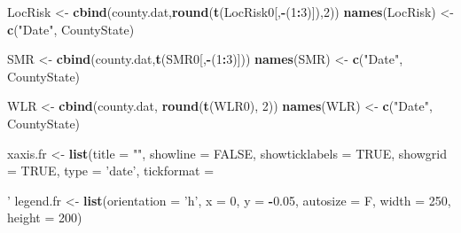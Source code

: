\documentclass[]{book}
\newenvironment{Shaded}{\begin{snugshade}}{\end{snugshade}}
\newcommand{\KeywordTok}[1]{\textcolor[rgb]{0.13,0.29,0.53}{\textbf{#1}}}
\newcommand{\DataTypeTok}[1]{\textcolor[rgb]{0.13,0.29,0.53}{#1}}
\newcommand{\DecValTok}[1]{\textcolor[rgb]{0.00,0.00,0.81}{#1}}
\newcommand{\FloatTok}[1]{\textcolor[rgb]{0.00,0.00,0.81}{#1}}
\newcommand{\StringTok}[1]{\textcolor[rgb]{0.31,0.60,0.02}{#1}}
\newcommand{\OtherTok}[1]{\textcolor[rgb]{0.56,0.35,0.01}{#1}}
\newcommand{\OperatorTok}[1]{\textcolor[rgb]{0.81,0.36,0.00}{\textbf{#1}}}
\newcommand{\NormalTok}[1]{#1}
\begin{document}
\begin{Shaded}
\begin{Highlighting}[]
{{{{{{{{\NormalTok{  LocRisk <-}\StringTok{ }\KeywordTok{cbind}\NormalTok{(county.dat,}\KeywordTok{round}\NormalTok{(}\KeywordTok{t}\NormalTok{(LocRisk0[,}\OperatorTok{-}\NormalTok{(}\DecValTok{1}\OperatorTok{:}\DecValTok{3}\NormalTok{)]),}\DecValTok{2}\NormalTok{))}
  \KeywordTok{names}\NormalTok{(LocRisk) <-}\StringTok{ }\KeywordTok{c}\NormalTok{(}\StringTok{"Date"}\NormalTok{, CountyState)}

\NormalTok{  SMR <-}\StringTok{ }\KeywordTok{cbind}\NormalTok{(county.dat,}\KeywordTok{t}\NormalTok{(SMR0[,}\OperatorTok{-}\NormalTok{(}\DecValTok{1}\OperatorTok{:}\DecValTok{3}\NormalTok{)]))}
  \KeywordTok{names}\NormalTok{(SMR) <-}\StringTok{ }\KeywordTok{c}\NormalTok{(}\StringTok{"Date"}\NormalTok{, CountyState)}

\NormalTok{  WLR <-}\StringTok{ }\KeywordTok{cbind}\NormalTok{(county.dat, }\KeywordTok{round}\NormalTok{(}\KeywordTok{t}\NormalTok{(WLR0), }\DecValTok{2}\NormalTok{))}
  \KeywordTok{names}\NormalTok{(WLR) <-}\StringTok{ }\KeywordTok{c}\NormalTok{(}\StringTok{"Date"}\NormalTok{, CountyState)}

\NormalTok{  xaxis.fr <-}\StringTok{ }\KeywordTok{list}\NormalTok{(}\DataTypeTok{title =} \StringTok{""}\NormalTok{, }\DataTypeTok{showline =} \OtherTok{FALSE}\NormalTok{, }
                   \DataTypeTok{showticklabels =} \OtherTok{TRUE}\NormalTok{, }\DataTypeTok{showgrid =} \OtherTok{TRUE}\NormalTok{, }
                   \DataTypeTok{type =} \StringTok{'date'}\NormalTok{, }\DataTypeTok{tickformat =} \StringTok{'%
\NormalTok{  legend.fr <-}\StringTok{ }\KeywordTok{list}\NormalTok{(}\DataTypeTok{orientation =} \StringTok{'h'}\NormalTok{, }\DataTypeTok{x =} \DecValTok{0}\NormalTok{, }\DataTypeTok{y =} \OperatorTok{-}\FloatTok{0.05}\NormalTok{, }
                    \DataTypeTok{autosize =}\NormalTok{ F, }\DataTypeTok{width =} \DecValTok{250}\NormalTok{, }\DataTypeTok{height =} \DecValTok{200}\NormalTok{)}

}}}}}}}}}
\end{Highlighting}
\end{Shaded}
\end{document}

